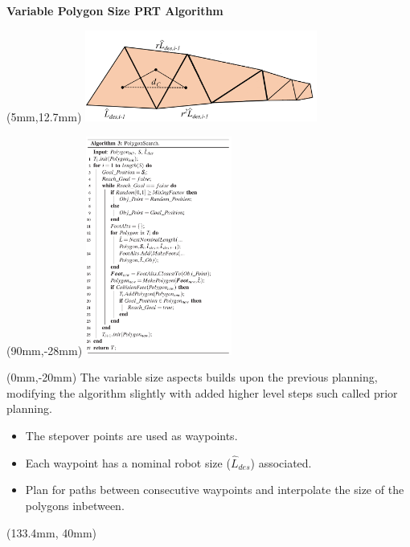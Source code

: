 \documentclass[11pt,aspectratio=169]{beamer}
\begin{document}
\begin{frame}[fragile]{\textbf{Variable Polygon Size PRT Algorithm}}
    
        \begin{textblock*}{5cm}(5mm,12.7mm) %
        \includegraphics[height=30mm]{elements/[22]-PRT-V.png}
        \end{textblock*}

        \begin{textblock*}{5cm}(90mm,-28mm) %
        \includegraphics[height=72mm]{elements/[23]-PRT-V.png}
        \end{textblock*}

        \begin{textblock*}{88mm}(0mm,-20mm)
        The variable size aspects builds upon the previous planning, modifying the algorithm slightly with added higher level steps such called prior planning.
        \vspace{2mm}
        \begin{itemize}
            \item The stepover points are used as \alert{waypoints}.
            \item Each waypoint has a nominal robot size ($\hat{L}_{des}$) associated.
            \item Plan for paths between consecutive waypoints and interpolate the size of the polygons inbetween.
        \end{itemize}
        \end{textblock*}

        \begin{textblock*}{5cm}(133.4mm, 40mm) %
        {\tiny \cite{9477154}}
        \end{textblock*}

        \vspace{10mm}

\end{frame}
\end{document}
